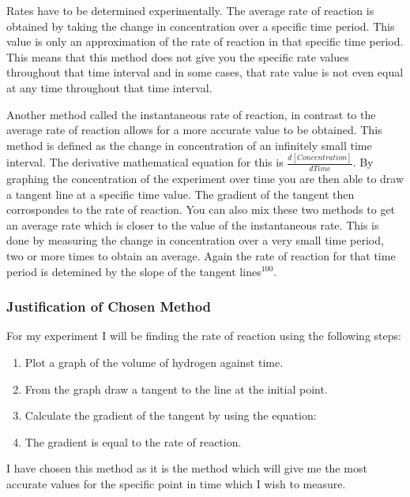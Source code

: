 Rates have to be determined experimentally. The average rate of reaction is obtained by taking the change in concentration over a specific time period. This value is only an approximation of the rate of reaction in that specific time period. This means that this method does not give you the specific rate values throughout that time interval and in some cases, that rate value is not even equal at any time throughout that time interval.

Another method called the instantaneous rate of reaction, in contrast to the average rate of reaction allows for a more accurate value to be obtained. This method is defined as the change in concentration of an infinitely small time interval. The derivative mathematical equation for this is $\frac{d[Concentration]}{dTime}$. By graphing the concentration of the experiment over time you are then able to draw a tangent line at a specific time value. The gradient of the tangent then corrospondes to the rate of reaction. You can also mix these two methods to get an average rate which is closer to the value of the instantaneous rate. This is done by measuring the change in concentration over a very small time period, two or more times to obtain an average. Again the rate of reaction for that time period is detemined by the slope of the tangent lines$^100$.





		\subsubsection{Justification of Chosen Method}

For my experiment I will be finding the rate of reaction using the following steps:

\begin{enumerate}
\item Plot a graph of the volume of hydrogen against time.
\item From the graph draw a tangent to the line at the initial point.
\item Calculate the gradient of the tangent by using the equation: 
\item The gradient is equal to the rate of reaction.
\end{enumerate}

I have chosen this method as it is the method which will give me the most accurate values for the specific point in time which I wish to measure. 






